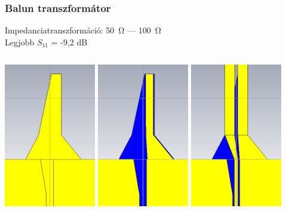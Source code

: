 \documentclass[aspectratio=43]{beamer}
\begin{document}
\begin{frame}
	\frametitle{Balun transzformátor}
		\centering
		Impedanciatranszformáció: \SI{50}{\ohm} --- \SI{100}{\ohm} \\
		Legjobb $S_{11}$ = -9,2 dB \\
		\vspace{\fill}
		\begin{columns}
				\centering
				\centering
				\includegraphics[width=0.3\textwidth]{balun_1.png}
				\includegraphics[width=0.3\textwidth]{balun_2.png}
				\includegraphics[width=0.3\textwidth]{balun_3.png}
				\centering
		\end{columns}
\end{frame}
\end{document}

